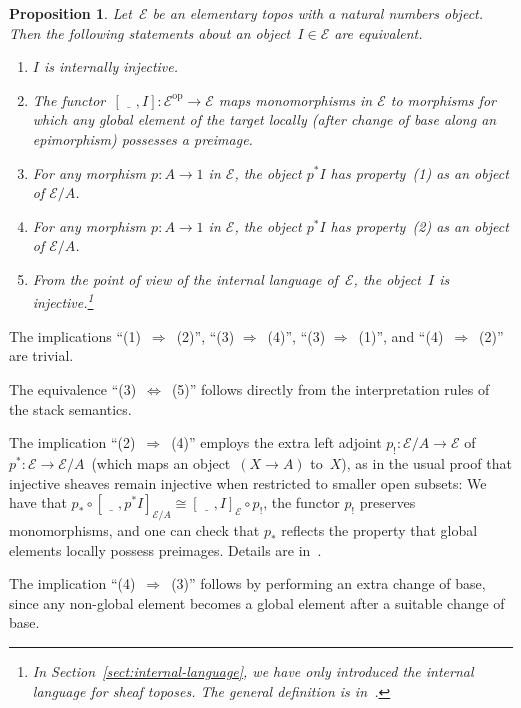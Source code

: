 \documentclass[10pt,reqno,a4paper]{amsbook}
\makeatletter
\theoremstyle{definition}
\theoremstyle{plain}
\newtheorem{prop}[defn]{Proposition}
\theoremstyle{remark}
\newcommand{\E}{\mathcal{E}}
\newcommand{\placeholder}{\underline{\quad}}
\newcommand{\op}{\mathrm{op}}
\newcommand{\?}{\,{:}\,}
\renewcommand{\_}{\mathpunct{.}\,}
\renewenvironment{proof}[1][\proofname]{\par
  \pushQED{\qed}%
  \normalfont \topsep6\p@\@plus6\p@\relax
  \trivlist
  \item[\hskip\labelsep
        \itshape
    #1\@addpunct{.}]\ignorespaces
}{%
  \popQED\endtrivlist\@endpefalse
}
\makeatother
\begin{document}
\begin{prop}\label{prop:notions-of-internal-injectivity}
Let~$\E$ be an elementary topos with a natural numbers object. Then
the following statements about an object~$I \in \E$ are equivalent.
\begin{enumerate}
\item $I$ is internally injective.
\item The functor~$[\placeholder, I] : \E^\op \to \E$ maps monomorphisms in $\E$
to morphisms for which any global element of the target locally (after change of
base along an epimorphism) possesses a preimage.
\item For any morphism $p : A \to 1$ in $\E$, the object $p^*I$ has property~(1)
as an object of $\E/A$.
\item For any morphism $p : A \to 1$ in $\E$, the object $p^*I$ has property~(2)
as an object of $\E/A$.
\item From the point of view of the internal language of~$\E$, the object~$I$
is injective.\footnote{In Section~\ref{sect:internal-language}, we have only
introduced the internal language for sheaf toposes. The general definition is
in~\cite[Section~7]{shulman:stack}.}
\end{enumerate}
\end{prop}

\begin{proof}
The implications ``(1)~$\Rightarrow$~(2)'', ``(3) $\Rightarrow$~(4)'', ``(3)
$\Rightarrow$~(1)'', and ``(4)~$\Rightarrow$~(2)'' are trivial.

The equivalence ``(3)~$\Leftrightarrow$~(5)'' follows directly from the
interpretation rules of the stack semantics.

The implication ``(2)~$\Rightarrow$~(4)'' employs the
extra left adjoint $p_! : \E/A \to \E$ of $p^* : \E
\to \E/A$~(which maps an object~$(X \to A)$ to~$X$), as in the usual proof that
injective sheaves remain injective when
restricted to smaller open subsets: We have that $p_* \circ [\placeholder, p^*I]_{\E/A}
\cong [\placeholder, I]_\E \circ p_!$, the functor $p_!$ preserves monomorphisms, and one
can check that $p_*$ reflects the property that global elements locally possess
preimages. Details are in~\cite[Thm.~(1)1]{harting}.

The implication ``(4)~$\Rightarrow$~(3)'' follows by performing an extra change of
base, since any non-global element becomes a global element after a suitable
change of base.
\end{proof}
\end{document}
